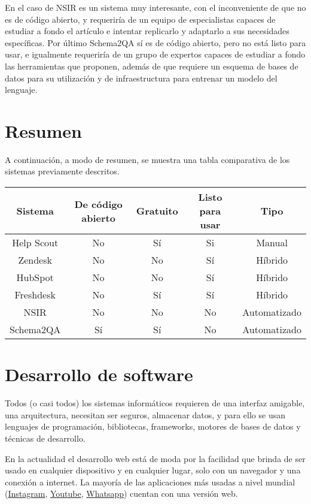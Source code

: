  En el caso de NSIR es un sistema muy interesante, con el inconveniente de que no es de código abierto, y requeriría de un equipo de especialistas capaces de estudiar a fondo el artículo e intentar replicarlo y adaptarlo a sus necesidades específicas. Por último Schema2QA sí es de código abierto, pero no está listo para usar, e igualmente requeriría de un grupo de expertos capaces de estudiar a fondo las herramientas que proponen, además de que requiere un esquema de bases de datos para su utilización y de infraestructura para entrenar un modelo del lenguaje.
 \newline
 
 \section{Resumen}
 
 A continuación, a modo de resumen, se muestra una tabla comparativa de los sistemas previamente descritos.\newline
 
 
 \begin{tabular}{| c | c | c | c | c |}
 	\hline
 	Sistema & De código abierto & Gratuito & Listo para usar & Tipo \\ \hline
 	Help Scout & No & Sí & Si & Manual \\ \hline 
 	Zendesk & No & No & Sí & Híbrido \\ \hline
 	HubSpot & No & No & Sí & Híbrido \\ \hline
 	Freshdesk & No & Sí & Sí & Híbrido \\ \hline
 	NSIR & No & No & No & Automatizado \\ \hline
 	Schema2QA & Sí & Sí & No & Automatizado \\ \hline
 	
 \end{tabular}\newline

\section{Desarrollo de software}

Todos (o casi todos) los sistemas informáticos requieren de una interfaz amigable, una arquitectura, necesitan ser seguros, almacenar datos, y para ello se usan lenguajes de programación, bibliotecas, frameworks, motores de bases de datos y técnicas de desarrollo.
\newline

En la actualidad el desarrollo web está de moda por la facilidad que brinda de ser usado en cualquier dispositivo y en cualquier lugar, solo con un navegador y una conexión a internet. La mayoría de las aplicaciones más usadas a nivel mundial (\href{instagram.com}{Instagram}, \href{youtube.com}{Youtube}, \href{https://web.whatsapp.com/}{Whatsapp}) cuentan con una versión web.
\newline

